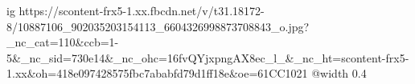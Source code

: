  
 
 
 
 

\ifcmt
  ig https://scontent-frx5-1.xx.fbcdn.net/v/t31.18172-8/10887106_902035203154113_6604326998873708843_o.jpg?_nc_cat=110&ccb=1-5&_nc_sid=730e14&_nc_ohc=16fvQYjxpngAX8ec_l_&_nc_ht=scontent-frx5-1.xx&oh=418e097428575fbc7ababfd79d1ff18e&oe=61CC1021
  @width 0.4
\fi
